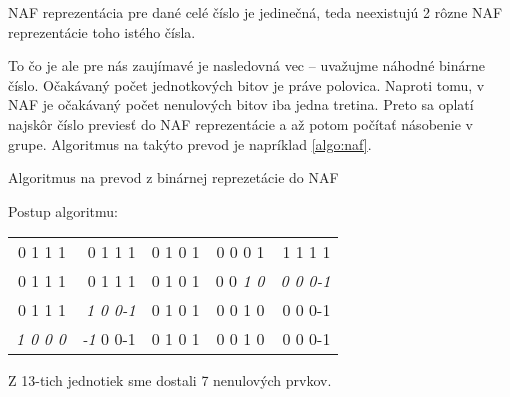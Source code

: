 \begin{poznamka}
    NAF reprezentácia pre dané celé číslo je jedinečná, teda
    neexistujú 2 rôzne NAF reprezentácie toho istého čísla.
\end{poznamka}

To čo je ale pre nás zaujímavé je nasledovná vec -- uvažujme náhodné
binárne číslo. Očakávaný počet jednotkových bitov je práve polovica.
Naproti tomu, v NAF je očakávaný počet nenulových bitov iba jedna
tretina. Preto sa oplatí najskôr číslo previesť do NAF reprezentácie a
až potom počítať násobenie v grupe. Algoritmus na takýto prevod je
napríklad \ref{algo:naf}.

\begin{algorithm}[H]
    \caption{Algoritmus na prevod z binárnej reprezetácie do NAF}
    \label{algo:naf}
\end{algorithm}

\begin{priklad}
    Postup algoritmu: \\
    \begin{center}
        \begin{tabular}{rrrrr}
            0 1 1 1& 0 1 1 1& 0 1 0 1& 0 0 0 1& 1 1 1 1 \\
            0 1 1 1& 0 1 1 1& 0 1 0 1& 0 0 \emph{1 0}& \emph{0 0 0-1} \\
            0 1 1 1& \emph{1 0 0-1}& 0 1 0 1& 0 0 1 0& 0 0 0-1 \\
            \emph{1 0 0 0}&\emph{-1} 0 0-1& 0 1 0 1& 0 0 1 0& 0 0 0-1
        \end{tabular}
    \end{center}
    Z 13-tich jednotiek sme dostali 7 nenulových prvkov.
\end{priklad}
